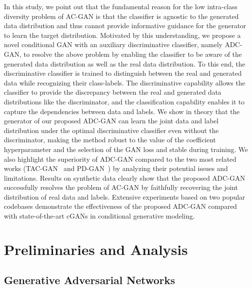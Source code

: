 \documentclass[nohyperref]{article}
\theoremstyle{plain}
\theoremstyle{definition}
\theoremstyle{remark}
\begin{document}
In this study, we point out that the fundamental reason for the low intra-class diversity problem of AC-GAN is that the classifier is agnostic to the generated data distribution and thus cannot provide informative guidance for the generator to learn the target distribution.
Motivated by this understanding, we propose a novel conditional GAN with an auxiliary discriminative classifier, namely ADC-GAN, to resolve the above problem by enabling the classifier to be aware of the generated data distribution as well as the real data distribution.
To this end, the discriminative classifier is trained to distinguish between the real and generated data while recognizing their class-labels.
The discriminative capability allows the classifier to provide the discrepancy between the real and generated data distributions like the discriminator, and the classification capability enables it to capture the dependencies between data and labels.
We show in theory that the generator of our proposed ADC-GAN can learn the joint data and label distribution under the optimal discriminative classifier even without the discriminator, making the method robust to the value of the coefficient hyperparameter and the selection of the GAN loss and stable during training.
We also highlight the superiority of ADC-GAN compared to the two most related works (TAC-GAN~\cite{NEURIPS2019_4ea06fbc} and PD-GAN~\cite{miyato2018cgans}) by analyzing their potential issues and limitations.
Results on synthetic data clearly show that the proposed ADC-GAN successfully resolves the problem of AC-GAN by faithfully recovering the joint distribution of real data and labels.
Extensive experiments based on two popular codebases demonstrate the effectiveness of the proposed ADC-GAN compared with state-of-the-art cGANs in conditional generative modeling.


\section{Preliminaries and Analysis}

\subsection{Generative Adversarial Networks}
\end{document}
